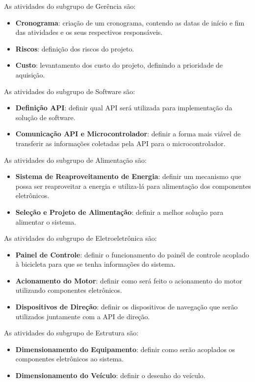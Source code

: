 		As atividades do subgrupo de Gerência são:
		
		\begin{itemize}
			\item \textbf{Cronograma}: criação de um cronograma, contendo as datas de início e fim das atividades e os seus respectivos responsáveis.
			\item \textbf{Riscos}: definição dos riscos do projeto.
			\item \textbf{Custo}: levantamento dos custo do projeto, definindo a prioridade de aquisição.
		\end{itemize}	
		
		As atividades do subgrupo de Software são:
		
		\begin{itemize}
			\item \textbf{Definição API}: definir qual API será utilizada para implementação da solução de software.
			\item \textbf{Comunicação API e Microcontrolador}: definir a forma mais viável de transferir as informações coletadas pela API para o microcontrolador.
		\end{itemize}				
		
		As atividades do subgrupo de Alimentação são:
		
		\begin{itemize}
			\item \textbf{Sistema de Reaproveitamento de Energia}: definir um mecanismo que possa ser reaproveitar a energia e utiliza-lá para alimentação dos componentes eletrônicos.
			\item \textbf{Seleção e Projeto de Alimentação}: definir a melhor solução para alimentar o sistema. 
		\end{itemize}		
		
		As atividades do subgrupo de Eletroeletrônica são:
		\begin{itemize}
			\item \textbf{Painel de Controle}: definir o funcionamento do painél de controle acoplado à bicicleta para que se tenha informações do sistema.
			\item \textbf{Acionamento do Motor}: definir como será feito o acionamento do motor utilizando componentes eletrônicos.
			\item \textbf{Dispositivos de Direção}: definir os dispositivos de navegação que serão utilizados juntamente com a API de direção.
		\end{itemize}
		
		As atividades do subgrupo de Estrutura são:
		\begin{itemize}
			\item \textbf{Dimensionamento do Equipamento}: definir como serão acoplados os componentes eletrônicos ao sistema.
			\item \textbf{Dimensionamento do Veículo}: definir o desenho do veículo.
		\end{itemize}
		
